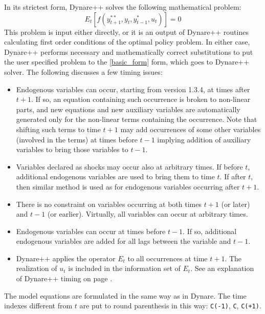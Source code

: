 \documentclass[10pt]{article}
\begin{document}
In its strictest form, Dynare++ solves the following mathematical problem:
\begin{equation}\label{basic_form}
E_t[f(y^{**}_{t+1},y_t,y^*_{t-1},u_t)]=0
\end{equation}
This problem is input either directly, or it is an output of Dynare++
routines calculating first order conditions of the optimal policy
problem. In either case, Dynare++ performs necessary and
mathematically correct substitutions to put the user specified problem
to the \eqref{basic_form} form, which goes to Dynare++ solver. The
following discusses a few timing issues:
\begin{itemize}
\item Endogenous variables can occur, starting from version 1.3.4, at
times after $t+1$. If so, an equation containing such occurrence is
broken to non-linear parts, and new equations and new auxiliary
variables are automatically generated only for the non-linear terms
containing the occurrence. Note that shifting such terms to time $t+1$
may add occurrences of some other variables (involved in the terms) at
times before $t-1$ implying addition of auxiliary variables to bring
those variables to $t-1$.
\item Variables declared as shocks may occur also at arbitrary
times. If before $t$, additional endogenous variables are used to
bring them to time $t$. If after $t$, then similar method is used as
for endogenous variables occurring after $t+1$.
\item There is no constraint on variables occurring at both times
$t+1$ (or later) and $t-1$ (or earlier). Virtually, all variables can
occur at arbitrary times.
\item Endogenous variables can occur at times before $t-1$. If so,
additional endogenous variables are added for all lags between the
variable and $t-1$.
\item Dynare++ applies the operator $E_t$ to all occurrences at time
$t+1$. The realization of $u_t$ is included in the information set of
$E_t$. See an explanation of Dynare++ timing on page \pageref{timing}.
\end{itemize}

The model equations are formulated in the same way as in
Dynare. The time indexes different from $t$ are put to round
parenthesis in this way: {\tt C(-1)}, {\tt C}, {\tt C(+1)}.
\end{document}

